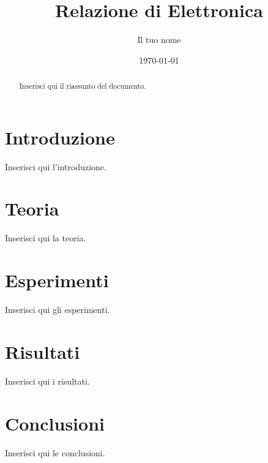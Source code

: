 \documentclass[a4paper,12pt]{article}
\title{Relazione di Elettronica}
\author{Il tuo nome}
\date{\today}
\begin{document}
\maketitle

\begin{abstract}
Inserisci qui il riassunto del documento.
\end{abstract}

\tableofcontents

\section{Introduzione}
Inserisci qui l'introduzione.

\section{Teoria}
Inserisci qui la teoria.

\section{Esperimenti}
Inserisci qui gli esperimenti.

\section{Risultati}
Inserisci qui i risultati.

\section{Conclusioni}
Inserisci qui le conclusioni.
\end{document}
